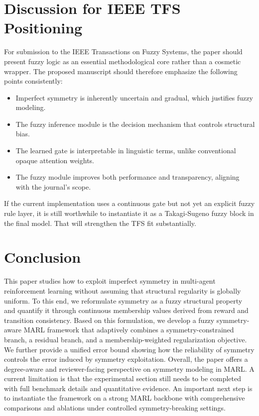\documentclass[lettersize,journal]{IEEEtran}
\begin{document}
\section{Discussion for IEEE TFS Positioning}
For submission to the IEEE Transactions on Fuzzy Systems, the paper should present fuzzy logic as an essential methodological core rather than a cosmetic wrapper. The proposed manuscript should therefore emphasize the following points consistently:
\begin{itemize}
\item Imperfect symmetry is inherently uncertain and gradual, which justifies fuzzy modeling.
\item The fuzzy inference module is the decision mechanism that controls structural bias.
\item The learned gate is interpretable in linguistic terms, unlike conventional opaque attention weights.
\item The fuzzy module improves both performance and transparency, aligning with the journal's scope.
\end{itemize}

If the current implementation uses a continuous gate but not yet an explicit fuzzy rule layer, it is still worthwhile to instantiate it as a Takagi-Sugeno fuzzy block in the final model. That will strengthen the TFS fit substantially.

\section{Conclusion}
This paper studies how to exploit imperfect symmetry in multi-agent reinforcement learning without assuming that structural regularity is globally uniform. To this end, we reformulate symmetry as a fuzzy structural property and quantify it through continuous membership values derived from reward and transition consistency. Based on this formulation, we develop a fuzzy symmetry-aware MARL framework that adaptively combines a symmetry-constrained branch, a residual branch, and a membership-weighted regularization objective. We further provide a unified error bound showing how the reliability of symmetry controls the error induced by symmetry exploitation. Overall, the paper offers a degree-aware and reviewer-facing perspective on symmetry modeling in MARL. A current limitation is that the experimental section still needs to be completed with full benchmark details and quantitative evidence. An important next step is to instantiate the framework on a strong MARL backbone with comprehensive comparisons and ablations under controlled symmetry-breaking settings.
\end{document}
